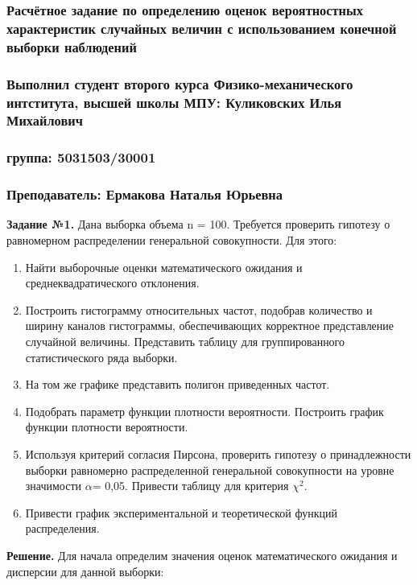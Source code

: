 \documentclass[a4paper, 12pt]{article}
\begin{document}
	\begin{center}
		\subsubsection*{Расчётное задание по определению оценок вероятностных характеристик случайных величин с использованием конечной выборки наблюдений}
		\subsubsection*{Выполнил студент второго курса Физико-механического интститута, высшей школы МПУ: Куликовских Илья Михайлович}
		\subsubsection*{группа: 5031503/30001}
		\subsubsection*{Преподаватель: Ермакова Наталья Юрьевна}
	\end{center}
	
	\quad \textbf{Задание №1.} Дана выборка объема n = 100. Требуется проверить гипотезу о равномерном
	распределении генеральной совокупности.
	Для этого:
	\begin{enumerate}
		\item Найти выборочные оценки математического ожидания и среднеквадратического отклонения.
		\item Построить гистограмму относительных частот, подобрав количество и ширину каналов гистограммы, обеспечивающих корректное представление случайной величины. Представить таблицу для группированного статистического ряда выборки.
		\item На том же графике представить полигон приведенных частот.
		\item Подобрать параметр функции плотности вероятности. Построить график функции плотности вероятности.
		\item Используя критерий согласия Пирсона, проверить гипотезу о принадлежности выборки равномерно распределенной генеральной совокупности на уровне значимости $\alpha$= 0,05. Привести таблицу для критерия $\chi^2$.
		\item Привести график экспериментальной и теоретической функций распределения.
	\end{enumerate}
	
	\quad \textbf{Решение.} Для начала определим значения оценок математического ожидания и дисперсии для данной выборки:
	
\end{document}
